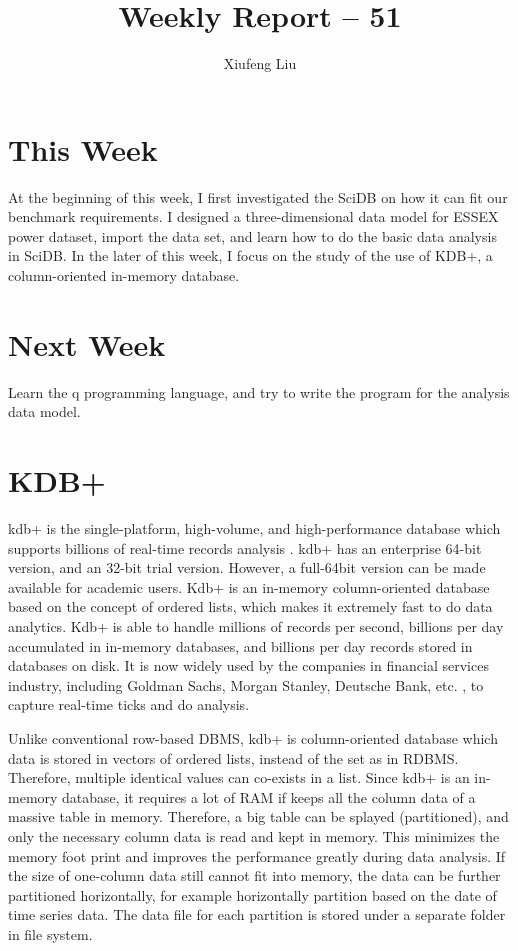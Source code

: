 \documentclass[a4paper,12pt]{llncs}
\begin{document}
\title{Weekly Report -- 51}
\author{Xiufeng Liu}
\maketitle


\section{This Week}
At the beginning of this week, I first investigated the SciDB on how it can fit our benchmark requirements. I designed a three-dimensional data model for ESSEX power dataset,  import the data set, and learn how to do the basic data analysis in SciDB. In the later of this week, I focus on the study of the use of KDB+, a column-oriented in-memory database.

\section{Next Week}
Learn the q programming language, and try to write the program for the  analysis data model.

\section{KDB+}
kdb+ is the single-platform, high-volume, and high-performance database which supports billions of real-time records analysis \cite{kdb}. kdb+ has an enterprise 64-bit version, and an 32-bit trial version. However,  a full-64bit version can be made available for academic users. Kdb+ is an in-memory column-oriented database based on the concept of ordered lists, which makes it extremely fast to do data analytics. Kdb+ is able to handle millions of records per second, billions per day accumulated in in-memory databases, and billions per day records stored in databases on disk.  It is now widely used by the companies in financial services industry, including Goldman Sachs, Morgan Stanley, Deutsche Bank, etc. \cite{kdbusers}, to capture real-time ticks and do analysis.

Unlike conventional row-based DBMS, kdb+ is column-oriented database which data is stored in vectors of ordered lists, instead of the set as in RDBMS. Therefore, multiple identical values can co-exists in a list. Since kdb+ is an in-memory database, it requires a lot of RAM if keeps all the column data of a massive table  in memory. Therefore,  a big table can be splayed (partitioned), and only the necessary column data is read and kept in memory. This minimizes the memory foot print and improves the performance greatly during data analysis. If the size of one-column data still cannot fit into memory, the data can be further partitioned horizontally, for example horizontally partition based on the date of time series data. The data file for each partition is stored under a separate folder in file system.
\end{document}
